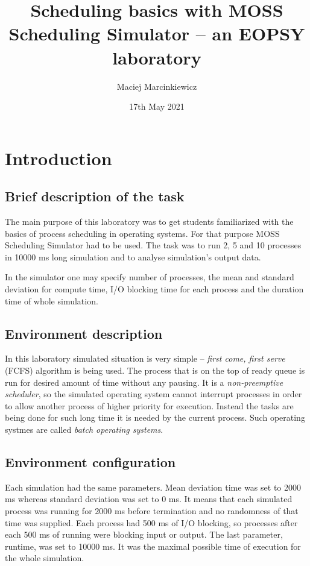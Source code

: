 \documentclass{article}
\title{Scheduling basics with MOSS Scheduling Simulator -- an EOPSY laboratory}
\author{Maciej Marcinkiewicz}
\date{17th May 2021}
\begin{document}
\maketitle

\section{Introduction}
\subsection{Brief description of the task}
The main purpose of this laboratory was to get students familiarized with the basics of
process scheduling in operating systems. For that purpose MOSS Scheduling Simulator had to
be used. The task was to run 2, 5 and 10 processes in 10000 ms long simulation and
to analyse simulation's output data.

In the simulator one may specify number of processes, the mean and standard deviation
for compute time, I/O blocking time for each process and the duration time of whole simulation.

\subsection{Environment description}
In this laboratory simulated situation is very simple -- \emph{first come, first serve}
(FCFS) algorithm is being used. The process that is on the top of
ready queue is run for desired amount of time without any pausing. It is a \emph{non-preemptive scheduler}, so the simulated
operating system cannot interrupt processes in order to allow another process of higher priority for
execution. Instead the tasks are being done for such long time it is needed by the current process.
Such operating systmes are called \emph{batch operating systems}.

\subsection{Environment configuration}
Each simulation had the same parameters. Mean deviation time was set to 2000 ms whereas
standard deviation was set to 0 ms. It means that each simulated process was running
for 2000 ms before termination and no randomness of that time was supplied.
Each process had 500 ms of I/O blocking, so processes after each 500 ms of running
were blocking input or output. The last parameter, runtime, was set to 10000 ms.
It was the maximal possible time of execution for the whole simulation.
\end{document}
